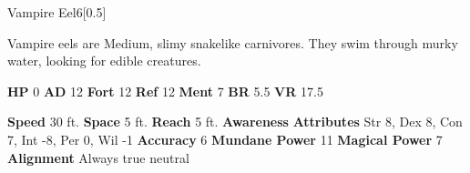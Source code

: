   
  \begin{monsection}{Vampire Eel}{6}[0.5]
    \vspace{-1em}\vspace{-1em}
    \vspace{0em}

    
        Vampire eels are Medium, slimy snakelike carnivores.
        They swim through murky water, looking for edible creatures.
      

    \begin{spellcontent}
      \begin{spelltargetinginfo}
        \pari \textbf{HP} 0 \monsep
          \textbf{AD} 12 \monsep
          \textbf{Fort} 12 \monsep
          \textbf{Ref} 12 \monsep
          \textbf{Ment} 7
        \pari \textbf{BR} 5.5 \monsep
        \textbf{VR} 17.5
        
      \end{spelltargetinginfo}
    \end{spellcontent}
    \begin{monsterfooter}
      \pari \textbf{Speed} 30 ft. \monsep
        \textbf{Space} 5 ft. \monsep
        \textbf{Reach} 5 ft.
      \pari \textbf{Awareness} 
      \pari \textbf{Attributes}
        Str 8, Dex 8,
        Con 7, Int -8,
        Per 0, Wil -1
      \pari \textbf{Accuracy} 6 \monsep
        \textbf{Mundane Power} 11 \monsep
      \textbf{Magical Power} 7
      \pari \textbf{Alignment} Always true neutral
    \end{monsterfooter}
  \end{monsection}
  
